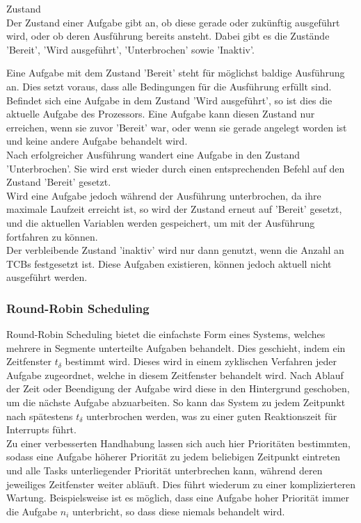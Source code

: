 \begin{definition}{Zustand}\\
Der Zustand einer Aufgabe gibt an, ob diese gerade oder zukünftig ausgeführt wird, oder ob deren Ausführung bereits ansteht. Dabei gibt es die Zustände 'Bereit', 'Wird ausgeführt', 'Unterbrochen' sowie 'Inaktiv'.
\end{definition}
Eine Aufgabe mit dem Zustand 'Bereit' steht für möglichst baldige Ausführung an. Dies setzt voraus, dass alle Bedingungen für die Ausführung erfüllt sind.\\
Befindet sich eine Aufgabe in dem Zustand 'Wird ausgeführt', so ist dies die aktuelle Aufgabe des Prozessors. Eine Aufgabe kann diesen Zustand nur erreichen, wenn sie zuvor 'Bereit' war, oder wenn sie gerade angelegt worden ist und keine andere Aufgabe behandelt wird.\\
Nach erfolgreicher Ausführung wandert eine Aufgabe in den Zustand 'Unterbrochen'. Sie wird erst wieder durch einen entsprechenden Befehl auf den Zustand 'Bereit' gesetzt.\\
Wird eine Aufgabe jedoch während der Ausführung unterbrochen, da ihre maximale Laufzeit erreicht ist, so wird der Zustand erneut auf 'Bereit' gesetzt, und die aktuellen Variablen werden gespeichert, um mit der Ausführung fortfahren zu können.\\
Der verbleibende Zustand 'inaktiv' wird nur dann genutzt, wenn die Anzahl an TCBs festgesetzt ist. Diese Aufgaben existieren, können jedoch aktuell nicht ausgeführt werden.

\subsubsection{Round-Robin Scheduling}
Round-Robin Scheduling bietet die einfachste Form eines Systems, welches mehrere in Segmente unterteilte Aufgaben behandelt. Dies geschieht, indem ein Zeitfenster $t_\delta$ bestimmt wird. Dieses wird in einem zyklischen Verfahren jeder Aufgabe zugeordnet, welche in diesem Zeitfenster behandelt wird. Nach Ablauf der Zeit oder Beendigung der Aufgabe wird diese in den Hintergrund geschoben, um die nächste Aufgabe abzuarbeiten. So kann das System zu jedem Zeitpunkt nach spätestens $t_\delta$ unterbrochen werden, was zu einer guten Reaktionszeit für Interrupts führt.\\
Zu einer verbesserten Handhabung lassen sich auch hier Prioritäten bestimmten, sodass eine Aufgabe höherer Priorität zu jedem beliebigen Zeitpunkt eintreten und alle Tasks unterliegender Priorität unterbrechen kann, während deren jeweiliges Zeitfenster weiter abläuft. Dies führt wiederum zu einer komplizierteren Wartung. Beispielsweise ist es möglich, dass eine Aufgabe hoher Priorität immer die Aufgabe $n_i$ unterbricht, so dass diese niemals behandelt wird.

